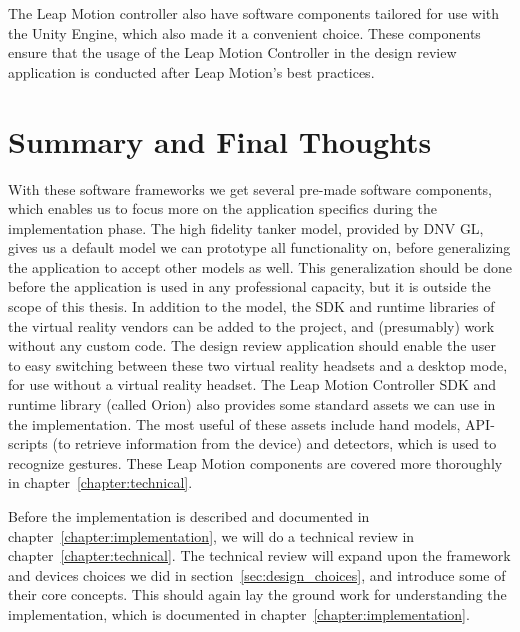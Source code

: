 The Leap Motion controller also have software components tailored for use with the Unity Engine, which also made it a convenient choice. 
These components ensure that the usage of the Leap Motion Controller in the design review application is conducted after Leap Motion's best practices. 

\section{Summary and Final Thoughts}
With these software frameworks we get several pre-made software components, which enables us to focus more on the application specifics during the implementation phase.
The high fidelity tanker model, provided by DNV GL, gives us a default model we can prototype all functionality on, before generalizing the application to accept other models as
well. This generalization should be done before the application is used in any professional capacity, but it is outside the scope of this thesis. 
In addition to the model, the SDK and runtime libraries of the virtual reality vendors can be added to the project, and (presumably) work without any custom code. 
The design review application should enable the user to easy switching between these two virtual reality headsets and a desktop mode, for use without a virtual reality headset.
The Leap Motion Controller SDK and runtime library (called Orion) also provides some standard assets we can use in the implementation. 
The most useful of these assets include hand models, API-scripts (to retrieve information from the device) and detectors, which is used to recognize gestures. 
These Leap Motion components are covered more thoroughly in chapter~\ref{chapter:technical}.

Before the implementation is described and documented in chapter~\ref{chapter:implementation}, we will do a technical review in chapter~\ref{chapter:technical}. 
The technical review will expand upon the framework and devices choices we did in section~\ref{sec:design_choices}, and introduce some of their core concepts. 
This should again lay the ground work for understanding the implementation, which is documented in chapter~\ref{chapter:implementation}.




